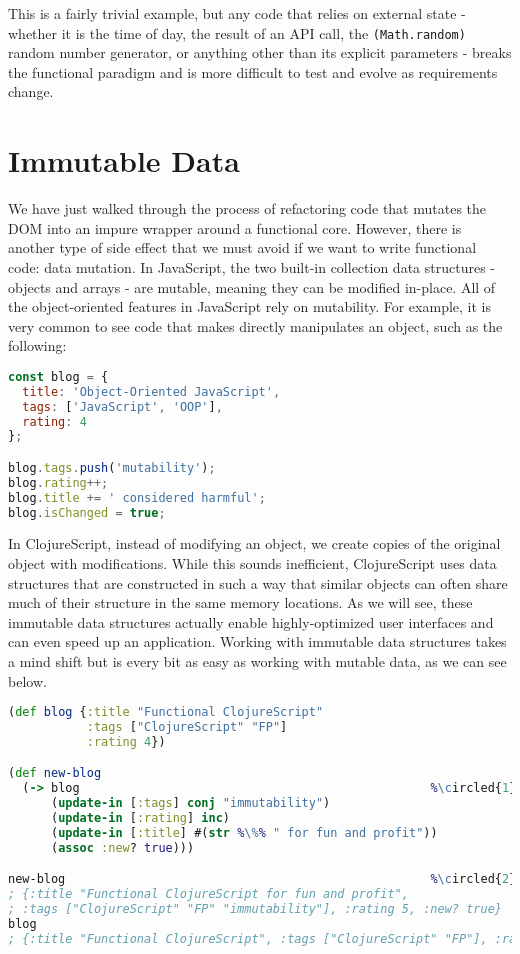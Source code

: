 \documentclass[10pt,twoside,openright]{memoir}
\newcommand*\circled[1]{\tikz[baseline=(char.base)]{
            \node[shape=circle,draw,inner sep=1pt] (char) {#1};}}
\begin{document}
This is a fairly trivial example, but any code that relies on external
state - whether it is the time of day, the result of an API call, the
\texttt{(Math.random)} random number generator, or anything other than
its explicit parameters - breaks the functional paradigm and is more
difficult to test and evolve as requirements change.


\section{Immutable Data}

We have just walked through the process of refactoring code that mutates
the DOM into an impure wrapper around a functional core. However, there
is another type of side effect that we must avoid if we want to write
functional code: data mutation. In JavaScript, the two built-in
collection data structures - objects and arrays - are mutable, meaning
they can be modified in-place. All of the object-oriented features in
JavaScript rely on mutability. For example, it is very common to see
code that makes directly manipulates an object, such as the following:

\begin{lstlisting}[language=JavaScript]
const blog = {
  title: 'Object-Oriented JavaScript',
  tags: ['JavaScript', 'OOP'],
  rating: 4
};

blog.tags.push('mutability');
blog.rating++;
blog.title += ' considered harmful';
blog.isChanged = true;
\end{lstlisting}

In ClojureScript, instead of modifying an object, we create copies of
the original object with modifications. While this sounds inefficient,
ClojureScript uses data structures that are constructed in such a way
that similar objects can often share much of their structure in the same
memory locations. As we will see, these immutable data structures
actually enable highly-optimized user interfaces and can even speed up
an application. Working with immutable data structures takes a mind
shift but is every bit as easy as working with mutable data, as we can
see below.

\begin{lstlisting}[language=Clojure]
(def blog {:title "Functional ClojureScript"
           :tags ["ClojureScript" "FP"]
           :rating 4})

(def new-blog
  (-> blog                                                 %\circled{1}%
      (update-in [:tags] conj "immutability")
      (update-in [:rating] inc)
      (update-in [:title] #(str %\%% " for fun and profit"))
      (assoc :new? true)))

new-blog                                                   %\circled{2}%
; {:title "Functional ClojureScript for fun and profit",
; :tags ["ClojureScript" "FP" "immutability"], :rating 5, :new? true}
blog
; {:title "Functional ClojureScript", :tags ["ClojureScript" "FP"], :rating 4}
\end{lstlisting}
\end{document}
